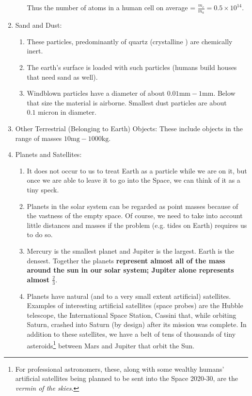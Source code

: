 \documentclass[12pt,a4paper]{book}
\newcounter{problem}[chapter] %
\begin{document}
\begin{enumerate}
\begin{enumerate}
                Thus the number of atoms in a human cell on average = $\frac{m_c}{m_a} = 0.5\times10^{14}$.
        \end{enumerate}
    \item Sand and Dust:
        \begin{enumerate}
            \item These particles, predominantly of quartz (crystalline ) are chemically inert. 
            \item The earth's surface is loaded with such particles (humans build houses that need sand as well). 
            \item Windblown particles have a diameter of about $0.01\si{\mm}-1\si{\mm}$. Below that size the material is airborne. Smallest dust particles are about $0.1 \text{ micron}$ in diameter. 
        \end{enumerate}
    \item Other Terrestrial (Belonging to Earth) Objects: These include objects in the range of masses $10\si{\mg}-1000\si{\kg}$.
    \item Planets and Satellites:
        \begin{enumerate}
            \item It does not occur to us to treat Earth as a particle while we are on it, but once we are able to leave it to go into the Space, we can think of it as a tiny speck.
            \item Planets in the solar system can be regarded as point masses because of the vastness of the empty space. Of course, we need to take into account little distances and masses if the problem (e.g. tides on Earth) requires us to do so.
            \item Mercury is the smallest planet and Jupiter is the largest. Earth is the densest. Together the planets \textbf{represent almost all of the mass around the sun in our solar system; Jupiter alone represents almost $\frac{2}{3}$}.
            \item Planets have natural (and to a very small extent artificial) satellites. Examples of interesting artificial satellites (space probes) are the Hubble telescope, the International Space Station, Cassini that, while orbiting Saturn, crashed into Saturn (by design) after its mission was complete. In addition to these satellites, we have a belt of tens of thousands of tiny asteroids\footnote{For professional astronomers, these, along with some wealthy humans' artificial satellites being planned to be sent into the Space 2020-30, are the \emph{vermin of the skies}.}  between Mars and Jupiter that orbit the Sun.

\end{enumerate}
\end{enumerate}
\end{document}
